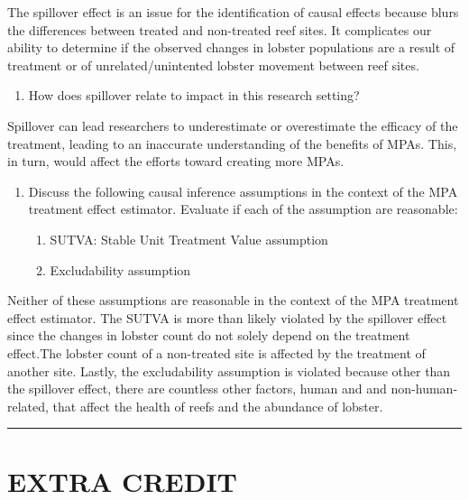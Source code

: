 \documentclass[
]{article}
\providecommand{\tightlist}{%
  \setlength{\itemsep}{0pt}\setlength{\parskip}{0pt}}
\begin{document}
The spillover effect is an issue for the identification of causal
effects because blurs the differences between treated and non-treated
reef sites. It complicates our ability to determine if the observed
changes in lobster populations are a result of treatment or of
unrelated/unintented lobster movement between reef sites.

\begin{enumerate}
\def\labelenumi{\alph{enumi}.}
\setcounter{enumi}{2}
\tightlist
\item
  How does spillover relate to impact in this research setting?
\end{enumerate}

Spillover can lead researchers to underestimate or overestimate the
efficacy of the treatment, leading to an inaccurate understanding of the
benefits of MPAs. This, in turn, would affect the efforts toward
creating more MPAs.

\begin{enumerate}
\def\labelenumi{\alph{enumi}.}
\setcounter{enumi}{3}
\item
  Discuss the following causal inference assumptions in the context of
  the MPA treatment effect estimator. Evaluate if each of the assumption
  are reasonable:

  \begin{enumerate}
  \def\labelenumii{\arabic{enumii})}
  \tightlist
  \item
    SUTVA: Stable Unit Treatment Value assumption
  \item
    Excludability assumption
  \end{enumerate}
\end{enumerate}

Neither of these assumptions are reasonable in the context of the MPA
treatment effect estimator. The SUTVA is more than likely violated by
the spillover effect since the changes in lobster count do not solely
depend on the treatment effect.The lobster count of a non-treated site
is affected by the treatment of another site. Lastly, the excludability
assumption is violated because other than the spillover effect, there
are countless other factors, human and and non-human-related, that
affect the health of reefs and the abundance of lobster.

\begin{center}\rule{0.5\linewidth}{0.5pt}\end{center}

\section{EXTRA CREDIT}\label{extra-credit}
\end{document}
